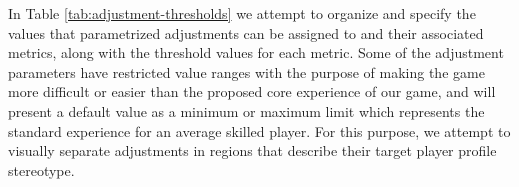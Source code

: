 In Table \ref{tab:adjustment-thresholds} we attempt to organize  and specify the values that parametrized adjustments can be assigned to and their associated metrics, along with the threshold values for each metric. Some of the adjustment parameters have restricted value ranges with the purpose of making the game more difficult or easier than the proposed core experience of our game, and will present a default value as a minimum or maximum limit which represents the standard experience for an average skilled player. For this purpose, we attempt to visually separate adjustments in regions that describe their target player profile stereotype.



